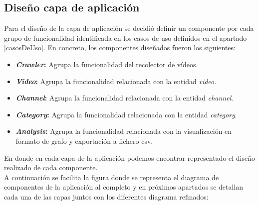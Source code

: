 \documentclass[11pt,a4paper]{article}
\begin{document}
\medskip 

\subsection{Diseño capa de aplicación}\label{capaAplicacion} 
Para el diseño de la capa de aplicación se decidió definir un componente por cada grupo de funcionalidad identificada en los casos de uso definidos en el apartado \ref{casosDeUso}. En concreto, los componentes diseñados fueron los siguientes:

\begin{itemize}
\item \textbf{\textit{Crawler}:} Agrupa la funcionalidad del recolector de vídeos.
\item \textbf{\textit{Video}:} Agrupa la funcionalidad relacionada con la entidad \textit{video}.
\item \textbf{\textit{Channel}:} Agrupa la funcionalidad relacionada con la entidad \textit{channel}.
\item \textbf{\textit{Category}:} Agrupa la funcionalidad relacionada con la entidad \textit{category}.
\item \textbf{\textit{Analysis}:} Agrupa la funcionalidad relacionada con la visualización en formato de grafo y exportación a fichero csv.
\end{itemize}

En donde en cada capa de la aplicación podemos encontrar representado el diseño realizado de cada componente.
\\

A continuación se facilita la figura donde se representa el diagrama de componentes de la aplicación al completo y en próximos apartados se detallan cada una de las capas juntos con los diferentes diagrama refinados:
\newpage 
\end{document}
